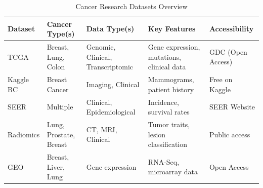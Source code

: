 \documentclass[conference]{IEEEtran}
\begin{document}

\begin{table}[htbp]
\caption{Cancer Research Datasets Overview}
\centering
\begin{tabular}{|p{1cm}|p{1cm}|p{1cm}|p{1.5cm}|p{1.4cm}|}
\hline
\textbf{Dataset} & \textbf{Cancer Type(s)} & \textbf{Data Type(s)} & \textbf{Key Features} & \textbf{Accessibility} \\
\hline
TCGA \cite{1} & Breast, Lung, Colon & Genomic, Clinical, Transcriptomic & Gene expression, mutations, clinical data & GDC (Open Access) \\
\hline
Kaggle BC \cite{12} & Breast Cancer & Imaging, Clinical & Mammograms, patient history & Free on Kaggle \\
\hline
SEER \cite{13} & Multiple & Clinical, Epidemiological & Incidence, survival rates & SEER Website \\
\hline
Radiomics \cite{14} & Lung, Prostate, Breast & CT, MRI, Clinical & Tumor traits, lesion classification & Public access \\
\hline
GEO \cite{16} & Breast, Liver, Lung & Gene expression & RNA-Seq, microarray data & Open Access \\
\hline
\end{tabular}
\label{tab:cancer_datasets}
\end{table}
\end{document}
